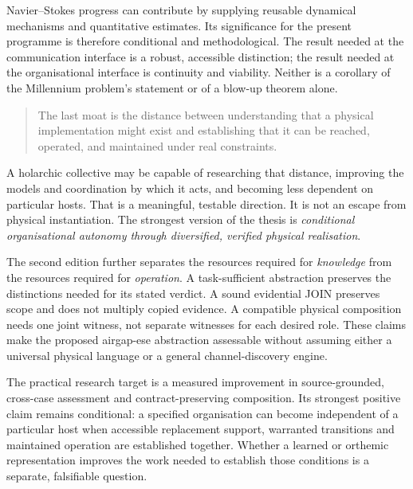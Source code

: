 \documentclass[11pt,a4paper]{article}
\theoremstyle{definition}
\theoremstyle{remark}
\begin{document}
Navier--Stokes progress can contribute by supplying reusable dynamical mechanisms and quantitative estimates. Its significance for the present programme is therefore conditional and methodological. The result needed at the communication interface is a robust, accessible distinction; the result needed at the organisational interface is continuity and viability. Neither is a corollary of the Millennium problem's statement or of a blow-up theorem alone.

\begin{quote}
The last moat is the distance between understanding that a physical implementation might exist and establishing that it can be reached, operated, and maintained under real constraints.
\end{quote}
A holarchic collective may be capable of researching that distance, improving the models and coordination by which it acts, and becoming less dependent on particular hosts. That is a meaningful, testable direction. It is not an escape from physical instantiation. The strongest version of the thesis is \emph{conditional organisational autonomy through diversified, verified physical realisation}.


The second edition further separates the resources required for \emph{knowledge} from the resources required for \emph{operation}. A task-sufficient abstraction preserves the distinctions needed for its stated verdict. A sound evidential JOIN preserves scope and does not multiply copied evidence. A compatible physical composition needs one joint witness, not separate witnesses for each desired role. These claims make the proposed airgap-ese abstraction assessable without assuming either a universal physical language or a general channel-discovery engine.

The practical research target is a measured improvement in source-grounded, cross-case assessment and contract-preserving composition. Its strongest positive claim remains conditional: a specified organisation can become independent of a particular host when accessible replacement support, warranted transitions and maintained operation are established together. Whether a learned or orthemic representation improves the work needed to establish those conditions is a separate, falsifiable question.


\appendix
\end{document}
